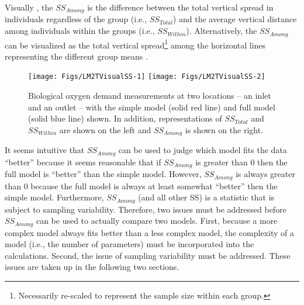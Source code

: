 \documentclass[10pt,openany]{book}\usepackage[]{graphicx}\usepackage[]{color}
\newenvironment{knitrout}{}{} %
\begin{document}
\vspace{-12pt}

Visually , the $SS_{Among}$ is the difference between the total vertical spread in individuals regardless of the group (i.e., $SS_{Total}$) and the average vertical distance among individuals within the groups (i.e., $SS_{Within}$).  Alternatively, the $SS_{Among}$ can be visualized as the total vertical spread\footnote{Necessarily re-scaled to represent the sample size within each group.} among the horizontal lines representing the different group means .

\begin{knitrout}
\color{fgcolor}\begin{figure}[hbtp]

{\centering \texttt{[image: Figs/LM2TVisualSS-1]} 
\texttt{[image: Figs/LM2TVisualSS-2]} 

}

\caption[Biological oxygen demand measurements at two locations -- an inlet and an outlet -- with the simple model (solid red line) and full model (solid blue line) shown]{Biological oxygen demand measurements at two locations -- an inlet and an outlet -- with the simple model (solid red line) and full model (solid blue line) shown.  In addition, representations of $SS_{Total}$ and $SS_{Within}$ are shown on the left and $SS_{Among}$ is shown on the right.}\label{fig:LM2TVisualSS}
\end{figure}


\end{knitrout}

It seems intuitive that $SS_{Among}$ can be used to judge which model fits the data ``better''  because it seems reasonable that if $SS_{Among}$ is greater than 0 then the full model is ``better'' than the simple model.  However, $SS_{Among}$ is always greater than 0 because the full model is always at least somewhat ``better'' then the simple model.  Furthermore, $SS_{Among}$ (and all other SS) is a statistic that is subject to sampling variability.  Therefore, two issues must be addressed before $SS_{Among}$ can be used to actually compare two models.  First, because a more complex model always fits better than a less complex model, the complexity of a model (i.e., the number of parameters) must be incorporated into the calculations.  Second, the issue of sampling variability must be addressed.  These issues are taken up in the following two sections.
\end{document}
